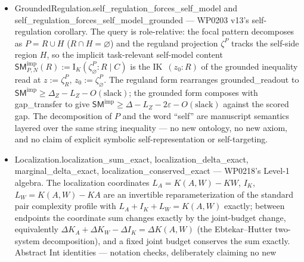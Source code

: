 \documentclass[11pt,a4paper]{article}
\newcommand{\lean}[1]{{\ttfamily\small
  \let\leanunderscore\_\def\_{\leanunderscore\allowbreak}#1}}
\newcommand{\Ik}{\mathrm{I}_K}
\begin{document}
\begin{itemize}[leftmargin=1.4em,itemsep=1pt]
hypothesis here). The GART inequality is then re-derived as its \emph{projection}:
dropping the two regulated-branch correction terms ($K(\zeta_R\mid\zeta_\varnothing,R,C)\ge
0$ and $\Ik(\zeta_R{:}R\mid C)\ge-\mathrm{slack}$, \lean{MutualNonnegC}) and composing with
conditional data processing (\lean{DataProcessingC}) gives
$\Delta_N^\zeta\le\Ik(W{:}R\mid C)+L_{\mathrm{cf}}+O(\mathrm{slack})$, so the formal
dependency graph matches the manuscript narrative equality $\to$ projection $\to$
inequality. Substituting \lean{residual\_is\_completion} at conditioning base
$\langle R,C\rangle$ closes the ledger: under reguland-level closure the residual term
\emph{is} $\mathrm{cIK}(\zeta_\varnothing{:}Q\mid\zeta_R,R,C)$ --- the residual is not a
sink but the matched-null information localized in the complementary realized records.
\item \lean{GroundedRegulation.self\_regulation\_forces\_self\_model} and
\lean{self\_regulation\_forces\_self\_model\_grounded} --- WP0203 v13's self-regulation
corollary. The query is role-relative: the focal pattern decomposes as $P=R\cup H$
($R\cap H=\varnothing$) and the reguland projection $\zeta^P$ tracks the self-side region
$H$, so the implicit task-relevant self-model content
$\mathsf{SM}^{\mathrm{imp}}_{P,N}(R):=\Ik(\zeta^P_\varnothing{:}R\mid C)$ is the
\lean{IK}~$(z_0{:}R)$ of the grounded inequality read at $z:=\zeta^P_R$,
$z_0:=\zeta^P_\varnothing$. The reguland form rearranges \lean{grounded\_readout} to
$\mathsf{SM}^{\mathrm{imp}}\ge\Delta_Z-L_Z-O(\mathrm{slack})$; the grounded form composes
with \lean{gap\_transfer} to give
$\mathsf{SM}^{\mathrm{imp}}\ge\Delta-L_Z-2\varepsilon-O(\mathrm{slack})$ against the scored
gap. The decomposition of $P$ and the word ``self'' are manuscript semantics layered over
the same string inequality --- no new ontology, no new axiom, and no claim of explicit
symbolic self-representation or self-targeting.
\item \lean{Localization.localization\_sum\_exact}, \lean{localization\_delta\_exact},
\lean{marginal\_delta\_exact}, \lean{localization\_conserved\_exact} --- WP0218's Level-1
algebra. The localization coordinates $L_A=K(A,W)-K W$, $I_K$, $L_W=K(A,W)-K A$ are an
invertible reparameterization of the standard pair complexity profile with
$L_A+I_K+L_W=K(A,W)$ exactly; between endpoints the coordinate sum changes exactly by the
joint-budget change, equivalently $\Delta K_A+\Delta K_W-\Delta I_K=\Delta K(A,W)$ (the
Ebtekar--Hutter two-system decomposition), and a fixed joint budget conserves the sum
exactly. Abstract \lean{Int} identities --- notation checks, deliberately claiming no new

\end{itemize}
\end{document}
